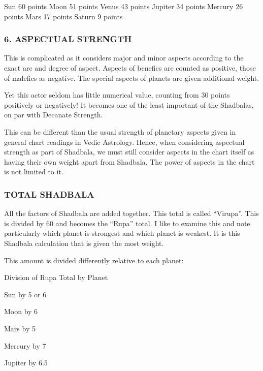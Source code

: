  

Sun	60 points	Moon	51 points
Venus	43 points	Jupiter	34 points
Mercury	26 points	Mars	17 points
Saturn	9 points		
 

\subsubsection{6. ASPECTUAL STRENGTH}
 

This is complicated as it considers major and minor aspects according to the exact arc and degree of aspect. Aspects of benefics are counted as positive, those of malefics as negative. The special aspects of planets are given additional weight.

 

Yet this actor seldom has little numerical value, counting from 30 points positively or negatively! It becomes one of the least important of the Shadbalas, on par with Decanate Strength.

 

This can be different than the usual strength of planetary aspects given in general chart readings in Vedic Astrology. Hence, when considering aspectual strength as part of Shadbala, we must still consider aspects in the chart itself as having their own weight apart from Shadbala. The power of aspects in the chart is not limited to it.

 

 

\subsubsection{TOTAL SHADBALA}

 

All the factors of Shadbala are added together. This total is called “Virupa”. This is divided by 60 and becomes the “Rupa” total. I like to examine this and note particularly which planet is strongest and which planet is weakest. It is this Shadbala calculation that is given the most weight.

 

This amount is divided differently relative to each planet:

Division of Rupa Total by Planet

Sun                by 5 or 6

Moon              by 6

Mars               by 5

Mercury          by 7

Jupiter            by 6.5

